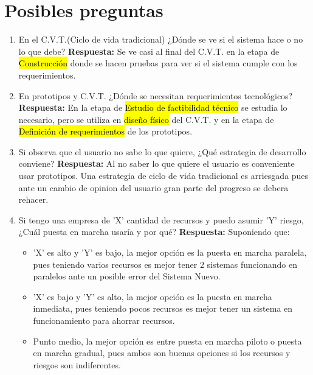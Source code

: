 \documentclass{templateNote}
\begin{document}
\newpage
\section{Posibles preguntas}
\begin{enumerate}
    \item En el C.V.T.(Ciclo de vida tradicional) ¿Dónde se ve si el sistema hace o no lo que debe?
    \newline
    \textbf{Respuesta:} Se ve casi al final del C.V.T. en la etapa de \hl{Construcción} donde se hacen pruebas para ver si el sistema cumple con los requerimientos.
    
    \item En prototipos y C.V.T. ¿Dónde se necesitan requerimientos tecnológicos?\newline
    \textbf{Respuesta:} En la etapa de \hl{Estudio de factibilidad técnico} se estudia lo necesario, pero se utiliza en \hl{diseño físico} del C.V.T. y en la etapa de \hl{Definición de requerimientos} de los prototipos.

    \item Si observa que el usuario no sabe lo que quiere, ¿Qué estrategia de desarrollo conviene?\newline
    \textbf{Respuesta:} Al no saber lo que quiere el usuario es conveniente usar prototipos. Una estrategia de ciclo de vida tradicional es arriesgada pues ante un cambio de opinion del usuario gran parte del progreso se debera rehacer.

    \item Si tengo una empresa de 'X' cantidad de recursos y puedo asumir 'Y' riesgo, ¿Cuál puesta en marcha usaría y por qué?\newline
    \textbf{Respuesta:} Suponiendo que:
    \begin{itemize}
        \item 'X' es alto y 'Y' es bajo, la mejor opción es la puesta en marcha paralela, pues teniendo varios recursos es mejor tener 2 sistemas funcionando en paralelos ante un posible error del Sistema Nuevo.
        \item 'X' es bajo y 'Y' es alto, la mejor opción es la puesta en marcha inmediata, pues teniendo pocos recursos es mejor tener un sistema en funcionamiento para ahorrar recursos.
        \item Punto medio, la mejor opción es entre puesta en marcha piloto o puesta en marcha gradual, pues ambos son buenas opciones si los recursos y riesgos son indiferentes.
    \end{itemize} 


\end{enumerate}
\end{document}
